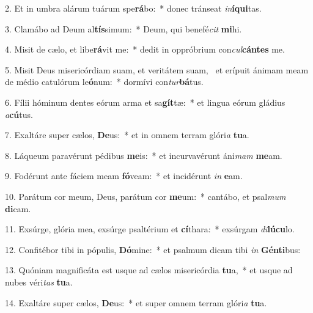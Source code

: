 2. Et in umbra alárum tuárum spe\textbf{rá}bo:~*  donec tránseat \textit{in}\textbf{í}\textbf{qui}tas.\

3. Clamábo ad Deum al\textbf{tís}simum:~*  Deum, qui benefé\textit{cit} \textbf{mi}hi.\

4. Misit de cælo, et libe\textbf{rá}vit me:~*  dedit in oppróbrium con\textit{cul}\textbf{cán}\textbf{tes} me.\

5. Misit Deus misericórdiam suam, et veritátem suam, \dag\  et erípuit ánimam meam de médio catulórum le\textbf{ó}num:~*  dormívi con\textit{tur}\textbf{bá}tus.\

6. Fílii hóminum dentes eórum arma et sa\textbf{gít}tæ:~*  et lingua eórum gládius \textit{a}\textbf{cú}tus.\

7. Exaltáre super cælos, \textbf{De}us:~*  et in omnem terram glóri\textit{a} \textbf{tu}a.\

8. Láqueum paravérunt pédibus \textbf{me}is:~*  et incurvavérunt áni\textit{mam} \textbf{me}am.\

9. Fodérunt ante fáciem meam \textbf{fó}veam:~*  et incidérunt \textit{in} \textbf{e}am.\

10. Parátum cor meum, Deus, parátum cor \textbf{me}um:~*  cantábo, et psal\textit{mum} \textbf{di}cam.\

11. Exsúrge, glória mea, exsúrge psaltérium et \textbf{cí}thara:~*  exsúrgam \textit{di}\textbf{lú}\textbf{cu}lo.\

12. Confitébor tibi in pópulis, \textbf{Dó}mine:~*  et psalmum dicam tibi \textit{in} \textbf{Gén}\textbf{ti}bus:\

13. Quóniam magnificáta est usque ad cælos misericórdia \textbf{tu}a,~*  et usque ad nubes véri\textit{tas} \textbf{tu}a.\

14. Exaltáre super cælos, \textbf{De}us:~*  et super omnem terram glóri\textit{a} \textbf{tu}a.\

